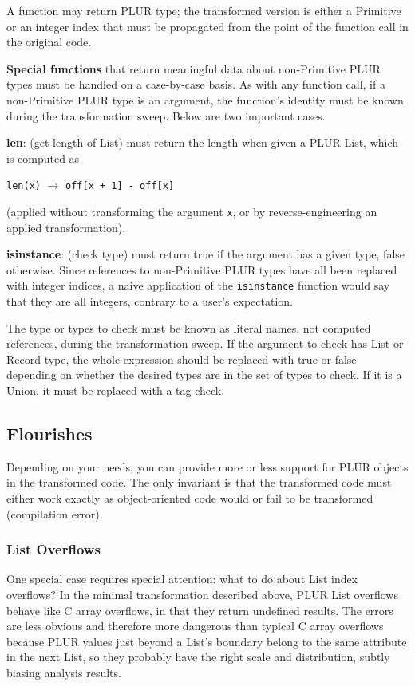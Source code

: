 \documentclass[10pt, conference, compsocconf]{IEEEtran}
\begin{document}
A function may return PLUR type; the transformed version is either a Primitive or an integer index that must be propagated from the point of the function call in the original code.

{\bf Special functions} that return meaningful data about non-Primitive PLUR types must be handled on a case-by-case basis. As with any function call, if a non-Primitive PLUR type is an argument, the function's identity must be known during the transformation sweep. Below are two important cases.

{\bf len}: (get length of List) must return the length when given a PLUR List, which is computed as
\begin{center}
{\tt len(x)} $\to$ {\tt off[x + 1] - off[x]}
\end{center}
(applied without transforming the argument {\tt x}, or by reverse-engineering an applied transformation).

{\bf isinstance}: (check type) must return true if the argument has a given type, false otherwise. Since references to non-Primitive PLUR types have all been replaced with integer indices, a naive application of the {\tt isinstance} function would say that they are all integers, contrary to a user's expectation.

The type or types to check must be known as literal names, not computed references, during the transformation sweep. If the argument to check has List or Record type, the whole expression should be replaced with true or false depending on whether the desired types are in the set of types to check. If it is a Union, it must be replaced with a tag check.

\subsection{Flourishes}

Depending on your needs, you can provide more or less support for PLUR objects in the transformed code. The only invariant is that the transformed code must either work exactly as object-oriented code would or fail to be transformed (compilation error).

\subsubsection{List Overflows}

One special case requires special attention: what to do about List index overflows? In the minimal transformation described above, PLUR List overflows behave like C array overflows, in that they return undefined results. The errors are less obvious and therefore more dangerous than typical C array overflows because PLUR values just beyond a List's boundary belong to the same attribute in the next List, so they probably have the right scale and distribution, subtly biasing analysis results.
\end{document}
